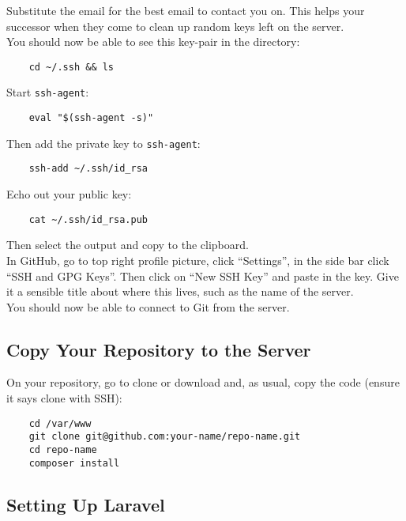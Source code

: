 Substitute the email for the best email to contact you on. This helps your successor when they come to clean up random keys left on the server.
\\


You should now be able to see this key-pair in the directory:

\begin{verbatim}
    cd ~/.ssh && ls
\end{verbatim}

Start \texttt{ssh-agent}:

\begin{verbatim}
    eval "$(ssh-agent -s)"
\end{verbatim}

Then add the private key to \texttt{ssh-agent}:

\begin{verbatim}
    ssh-add ~/.ssh/id_rsa
\end{verbatim}

Echo out your public key:

\begin{verbatim}
    cat ~/.ssh/id_rsa.pub
\end{verbatim}

Then select the output and copy to the clipboard.
\\

In GitHub, go to top right profile picture, click ``Settings'', in the side bar click ``SSH and GPG Keys''. Then click on ``New SSH Key'' and paste in the key. Give it a sensible title about where this lives, such as the name of the server.
\\

You should now be able to connect to Git from the server.


\subsection{Copy Your Repository to the Server}

On your repository, go to clone or download and, as usual, copy the code (ensure it says clone with SSH):

\begin{verbatim}
    cd /var/www
    git clone git@github.com:your-name/repo-name.git
    cd repo-name
    composer install
\end{verbatim}



\subsection{Setting Up Laravel}

